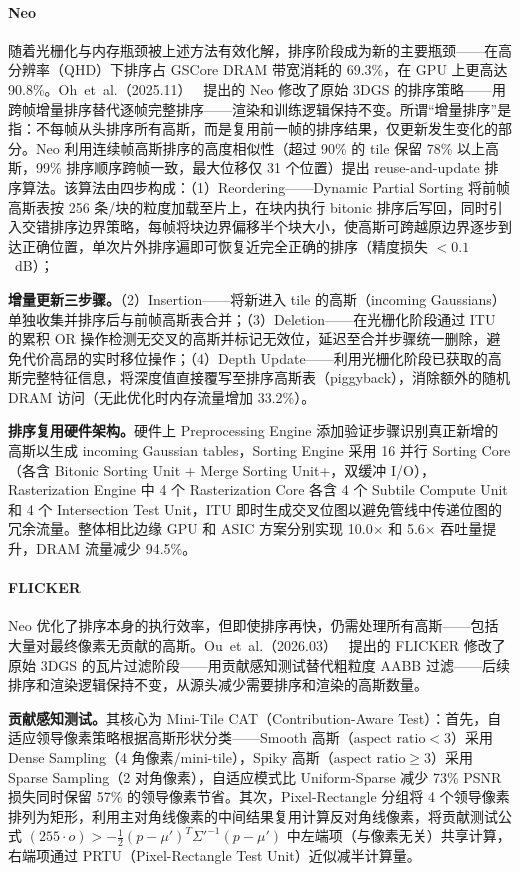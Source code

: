 \paragraph{Neo}
随着光栅化与内存瓶颈被上述方法有效化解，排序阶段成为新的主要瓶颈——在高分辨率（QHD）下排序占 GSCore DRAM 带宽消耗的 69.3\%，在 GPU 上更高达 90.8\%。Oh~et~al.（2025.11）~\cite{2511_12930} 提出的 Neo 修改了原始 3DGS 的排序策略——用跨帧增量排序替代逐帧完整排序——渲染和训练逻辑保持不变。所谓“增量排序”是指：不每帧从头排序所有高斯，而是复用前一帧的排序结果，仅更新发生变化的部分。Neo 利用连续帧高斯排序的高度相似性（超过 90\% 的 tile 保留 78\% 以上高斯，99\% 排序顺序跨帧一致，最大位移仅 31 个位置）提出 reuse-and-update 排序算法。该算法由四步构成：（1）Reordering——Dynamic Partial Sorting 将前帧高斯表按 256 条/块的粒度加载至片上，在块内执行 bitonic 排序后写回，同时引入交错排序边界策略，每帧将块边界偏移半个块大小，使高斯可跨越原边界逐步到达正确位置，单次片外排序遍即可恢复近完全正确的排序（精度损失 $< 0.1$~dB）；

\textbf{增量更新三步骤。}（2）Insertion——将新进入 tile 的高斯（incoming Gaussians）单独收集并排序后与前帧高斯表合并；（3）Deletion——在光栅化阶段通过 ITU 的累积 OR 操作检测无交叉的高斯并标记无效位，延迟至合并步骤统一删除，避免代价高昂的实时移位操作；（4）Depth Update——利用光栅化阶段已获取的高斯完整特征信息，将深度值直接覆写至排序高斯表（piggyback），消除额外的随机 DRAM 访问（无此优化时内存流量增加 33.2\%）。

\textbf{排序复用硬件架构。}硬件上 Preprocessing Engine 添加验证步骤识别真正新增的高斯以生成 incoming Gaussian tables，Sorting Engine 采用 16 并行 Sorting Core（各含 Bitonic Sorting Unit + Merge Sorting Unit+，双缓冲 I/O），Rasterization Engine 中 4 个 Rasterization Core 各含 4 个 Subtile Compute Unit 和 4 个 Intersection Test Unit，ITU 即时生成交叉位图以避免管线中传递位图的冗余流量。整体相比边缘 GPU 和 ASIC 方案分别实现 10.0$\times$ 和 5.6$\times$ 吞吐量提升，DRAM 流量减少 94.5\%。

\paragraph{FLICKER}
Neo 优化了排序本身的执行效率，但即使排序再快，仍需处理所有高斯——包括大量对最终像素无贡献的高斯。Ou~et~al.（2026.03）~\cite{2603_01158} 提出的 FLICKER 修改了原始 3DGS 的瓦片过滤阶段——用贡献感知测试替代粗粒度 AABB 过滤——后续排序和渲染逻辑保持不变，从源头减少需要排序和渲染的高斯数量。

\textbf{贡献感知测试。}其核心为 Mini-Tile CAT（Contribution-Aware Test）：首先，自适应领导像素策略根据高斯形状分类——Smooth 高斯（$\text{aspect ratio} < 3$）采用 Dense Sampling（4 角像素/mini-tile），Spiky 高斯（$\text{aspect ratio} \geq 3$）采用 Sparse Sampling（2 对角像素），自适应模式比 Uniform-Sparse 减少 73\% PSNR 损失同时保留 57\% 的领导像素节省。其次，Pixel-Rectangle 分组将 4 个领导像素排列为矩形，利用主对角线像素的中间结果复用计算反对角线像素，将贡献测试公式 $(255 \cdot o) > -\frac{1}{2}(p - \mu')^T \Sigma'^{-1} (p - \mu')$ 中左端项（与像素无关）共享计算，右端项通过 PRTU（Pixel-Rectangle Test Unit）近似减半计算量。

